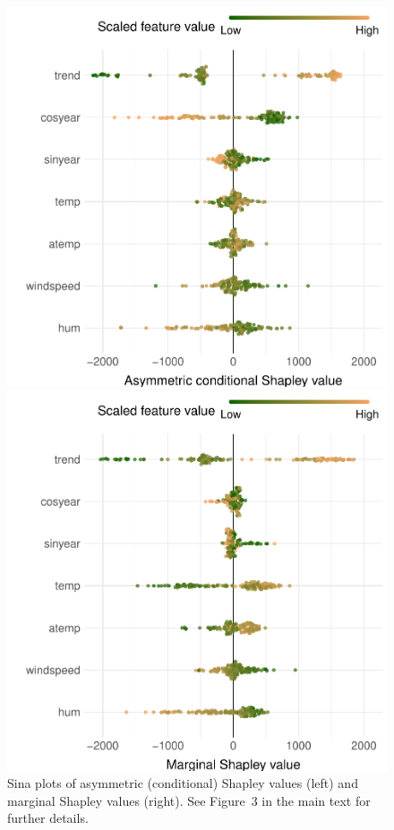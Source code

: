 \documentclass{article}
\begin{document}
\begin{figure}[t]
	\centering
	\begin{minipage}{.49\linewidth}
	\includegraphics[width=\textwidth]{figures/sina_plot_asymmetric.pdf}
	\end{minipage}
	\begin{minipage}{.49\linewidth}
	\includegraphics[width=\textwidth]{figures/sina_plot_marginal.pdf}
	\end{minipage}
	\caption{Sina plots of asymmetric (conditional) Shapley values (left) and marginal Shapley values (right). See Figure~3 in the main text for further details.}
	\label{fig:sinaplots}
\end{figure}
\end{document}

